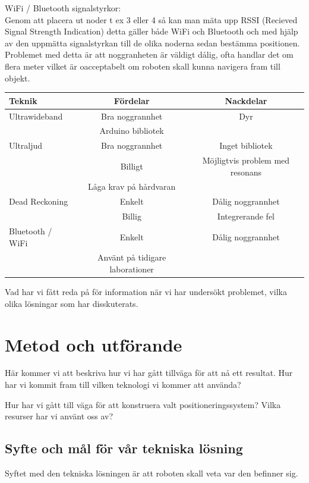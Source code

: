 \documentclass[11pt, a4paper]{report}
\begin{document}
WiFi / Bluetooth signalstyrkor: \\

Genom att placera ut noder t ex 3 eller 4 så kan man mäta upp RSSI (Recieved Signal Strength Indication) detta gäller både WiFi och Bluetooth och med hjälp av den uppmätta signalstyrkan till de olika noderna sedan bestämma positionen. Problemet med detta är att noggranheten är väldigt dålig, ofta handlar det om flera meter vilket är oacceptabelt om roboten skall kunna navigera fram till objekt.

\begin{center}
     \begin{tabular}{l | c | c}
  		Teknik & Fördelar & Nackdelar \\ \hline
        Ultrawideband & Bra noggrannhet & Dyr\\
         & Arduino bibliotek \\ \hline
        Ultraljud & Bra noggrannhet & Inget bibliotek\\
        & Billigt & Möjligtvis problem med resonans\\
        & Låga krav på hårdvaran \\ \hline
        Dead Reckoning & Enkelt & Dålig noggrannhet \\
        & Billig & Integrerande fel \\ \hline
        Bluetooth / WiFi & Enkelt & Dålig noggrannhet \\
        & Använt på tidigare laborationer
  \end{tabular}
  \end{center}


Vad har vi fått reda på för information när vi har undersökt problemet, vilka olika lösningar som har disskuterats. 

\chapter{Metod och utförande}
Här kommer vi att beskriva hur vi har gått tillväga för att nå ett resultat. Hur har vi kommit fram till vilken teknologi vi kommer att använda?

Hur har vi gått till väga för att konstruera valt positioneringssystem?
Vilka resurser har vi använt oss av?

\section{Syfte och mål för vår tekniska lösning}
Syftet med den tekniska lösningen är att roboten skall veta var den befinner sig.
\end{document}
